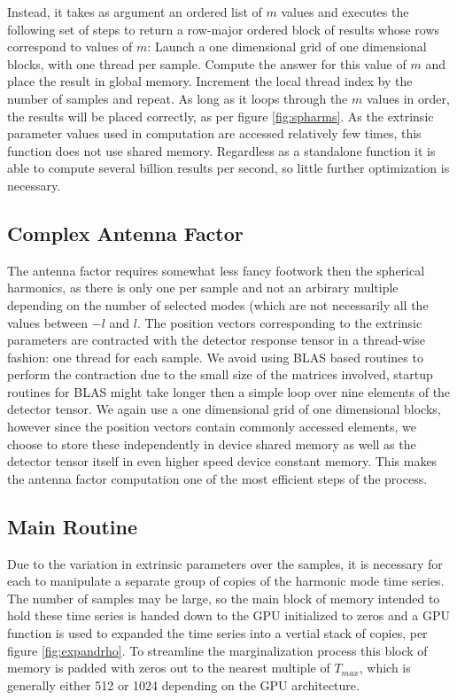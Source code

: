 Instead, it takes as argument an ordered list of $m$ values and executes the following set of steps to return a row-major ordered block of results whose rows correspond to values of $m$: Launch a one dimensional grid of one dimensional blocks, with one thread per sample. Compute the answer for this value of $m$ and place the result in global memory. Increment the local thread index by the number of samples and repeat. As long as it loops through the $m$ values in order, the results will be placed correctly, as per figure \ref{fig:spharms}. As the extrinsic parameter values used in computation are accessed relatively few times, this function does not use shared memory. Regardless as a standalone function it is able to compute several billion results per second, so little further optimization is necessary.



\subsection{Complex Antenna Factor}
The antenna factor requires somewhat less fancy footwork then the spherical harmonics, as there is only one per sample and not an arbirary multiple depending on the number of selected modes (which are not necessarily all the values between $-l$ and $l$. The position vectors corresponding to the extrinsic parameters are contracted with the detector response tensor in a thread-wise fashion: one thread for each sample. We avoid using BLAS based routines to perform the contraction due to the small size of the matrices involved, startup routines for BLAS might take longer then a simple loop over nine elements of the detector tensor. We again use a one dimensional grid of one dimensional blocks, however since the position vectors contain commonly accessed elements, we choose to store these independently in device shared memory as well as the detector tensor itself in even higher speed device constant memory. This makes the antenna factor computation one of the most efficient steps of the process.

\subsection{Main Routine}

Due to the variation in extrinsic parameters over the samples, it is necessary for each to manipulate a separate group of copies of the harmonic mode time series. The number of samples may be large, so the main block of memory intended to hold these time series is handed down to the GPU initialized to zeros and a GPU function is used to expanded the time series into a vertial stack of copies, per figure \ref{fig:expandrho}. To streamline the marginalization process this block of memory is padded with zeros out to the nearest multiple of $T_{max}$, which is generally either 512 or 1024 depending on the GPU architecture.  

